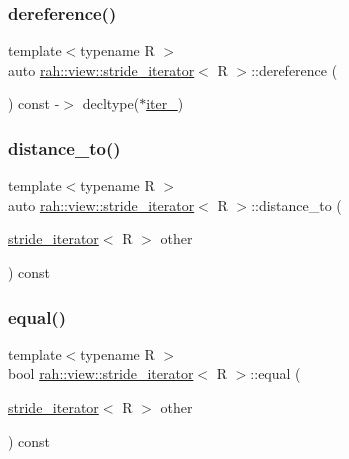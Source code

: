 \subsubsection{\texorpdfstring{dereference()}{dereference()}}
{\footnotesize\ttfamily template$<$typename R $>$ \\
auto \mbox{\hyperlink{structrah_1_1view_1_1stride__iterator}{rah\+::view\+::stride\+\_\+iterator}}$<$ R $>$\+::dereference (\begin{DoxyParamCaption}{ }\end{DoxyParamCaption}) const -\/$>$ decltype($\ast$\mbox{\hyperlink{structrah_1_1view_1_1stride__iterator_a65e7fa92e8026ce48e3c132e808e9ffc}{iter\+\_\+}}) \hspace{0.3cm}{\ttfamily [inline]}}

\mbox{\label{structrah_1_1view_1_1stride__iterator_ad30be3983aec3fab52efb32a1a461056}} 
\subsubsection{\texorpdfstring{distance\_to()}{distance\_to()}}
{\footnotesize\ttfamily template$<$typename R $>$ \\
auto \mbox{\hyperlink{structrah_1_1view_1_1stride__iterator}{rah\+::view\+::stride\+\_\+iterator}}$<$ R $>$\+::distance\+\_\+to (\begin{DoxyParamCaption}\item[{\mbox{\hyperlink{structrah_1_1view_1_1stride__iterator}{stride\+\_\+iterator}}$<$ R $>$}]{other }\end{DoxyParamCaption}) const\hspace{0.3cm}{\ttfamily [inline]}}

\mbox{\label{structrah_1_1view_1_1stride__iterator_a34c24e935ee7beebcd7269ee314e245a}} 
\subsubsection{\texorpdfstring{equal()}{equal()}}
{\footnotesize\ttfamily template$<$typename R $>$ \\
bool \mbox{\hyperlink{structrah_1_1view_1_1stride__iterator}{rah\+::view\+::stride\+\_\+iterator}}$<$ R $>$\+::equal (\begin{DoxyParamCaption}\item[{\mbox{\hyperlink{structrah_1_1view_1_1stride__iterator}{stride\+\_\+iterator}}$<$ R $>$}]{other }\end{DoxyParamCaption}) const\hspace{0.3cm}{\ttfamily [inline]}}

